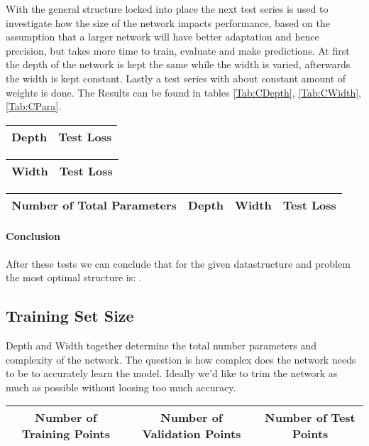 			\begin{figure}
				\centering
				\caption{}
				\label{key}
			\end{figure}
		
			With the general structure locked into place the next test series is used to investigate how the size of the network impacts performance, based on the assumption that a larger network will have better adaptation and hence precision, but takes more time to train, evaluate and make predictions. At first the depth of the network is kept the same while the width is varied, afterwards the width is kept constant. Lastly a test series with about constant amount of weights is done. The Results can be found in tables \ref{Tab:CDepth}, \ref{Tab:CWidth}, \ref{Tab:CPara}.
			
			\begin{tabularx}{\textwidth}{c|c}
				Depth & Test Loss\\
				\hline
			\end{tabularx}
			\begin{tabularx}{\textwidth}{c|c}
				Width & Test Loss\\
				\hline
			\end{tabularx}
			\begin{tabular}{c|c|c|c}
				Number of Total Parameters & Depth & Width & Test Loss \\
				\hline
			\end{tabular}
			\paragraph{Conclusion} After these tests we can conclude that for the given datastructure and problem the most optimal structure is: .

		\subsection{Training Set Size}
			Depth and Width together determine the total number parameters and complexity of the network. The question is how complex does the network needs to be to accurately learn the model. Ideally we'd like to trim the network as much as possible without loosing too much accuracy.\\
			\begin{tabular}{c|c|c}
				Number of Training Points & Number of Validation Points & Number of Test Points\\
				\hline
			\end{tabular}
